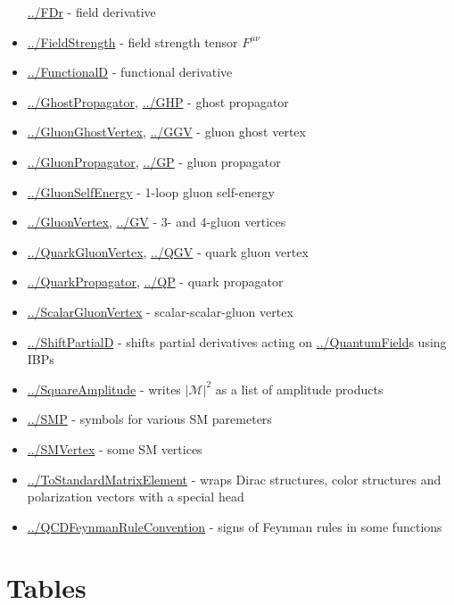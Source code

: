 \documentclass[../FeynCalcManual.tex]{subfiles}
\begin{document}
\begin{itemize}
  \hyperlink{../fdr}{../FDr} - field derivative
\item
  \hyperlink{../fieldstrength}{../FieldStrength} - field strength tensor
  \(F^{\mu \nu}\)
\item
  \hyperlink{../functionald}{../FunctionalD} - functional derivative
\item
  \hyperlink{../ghostpropagator}{../GhostPropagator},
  \hyperlink{../ghp}{../GHP} - ghost propagator
\item
  \hyperlink{../gluonghostvertex}{../GluonGhostVertex},
  \hyperlink{../ggv}{../GGV} - gluon ghost vertex
\item
  \hyperlink{../gluonpropagator}{../GluonPropagator},
  \hyperlink{../gp}{../GP} - gluon propagator
\item
  \hyperlink{../gluonselfenergy}{../GluonSelfEnergy} - 1-loop gluon
  self-energy
\item
  \hyperlink{../gluonvertex}{../GluonVertex}, \hyperlink{../gv}{../GV} -
  \(3\)- and \(4\)-gluon vertices
\item
  \hyperlink{../quarkgluonvertex}{../QuarkGluonVertex},
  \hyperlink{../qgv}{../QGV} - quark gluon vertex
\item
  \hyperlink{../quarkpropagator}{../QuarkPropagator},
  \hyperlink{../qp}{../QP} - quark propagator
\item
  \hyperlink{../scalargluonvertex}{../ScalarGluonVertex} -
  scalar-scalar-gluon vertex
\item
  \hyperlink{../shiftpartiald}{../ShiftPartialD} - shifts partial
  derivatives acting on \hyperlink{../quantumfield}{../QuantumField}s
  using IBPs
\item
  \hyperlink{../squareamplitude}{../SquareAmplitude} - writes
  \(|\mathcal{M}|^2\) as a list of amplitude products
\item
  \hyperlink{../smp}{../SMP} - symbols for various SM paremeters
\item
  \hyperlink{../smvertex}{../SMVertex} - some SM vertices
\item
  \hyperlink{../tostandardmatrixelement}{../ToStandardMatrixElement} -
  wraps Dirac structures, color structures and polarization vectors with
  a special head
\item
  \hyperlink{../qcdfeynmanruleconvention}{../QCDFeynmanRuleConvention} -
  signs of Feynman rules in some functions
\end{itemize}

\hypertarget{tables}{
\section{Tables}\label{tables}}
\end{document}
